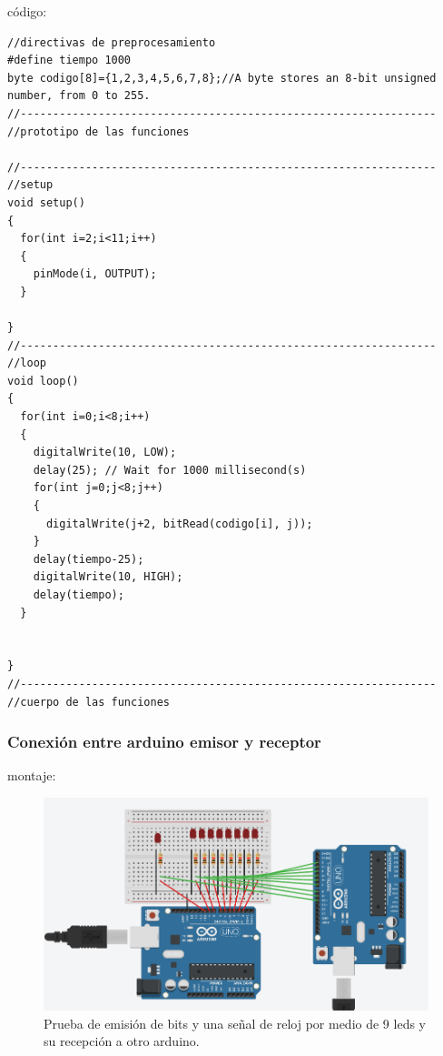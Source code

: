 \documentclass{article}
\begin{document}
código:
\begin{lstlisting}[style=myArduino]//directivas de preprocesamiento
#define tiempo 1000
byte codigo[8]={1,2,3,4,5,6,7,8};//A byte stores an 8-bit unsigned number, from 0 to 255.
//----------------------------------------------------------------
//prototipo de las funciones

//----------------------------------------------------------------
//setup
void setup()
{
  for(int i=2;i<11;i++)
  {
    pinMode(i, OUTPUT);
  }
  
}
//----------------------------------------------------------------
//loop
void loop()
{
  for(int i=0;i<8;i++)
  {
  	digitalWrite(10, LOW);
  	delay(25); // Wait for 1000 millisecond(s)
    for(int j=0;j<8;j++)
    {
      digitalWrite(j+2, bitRead(codigo[i], j));
    }
    delay(tiempo-25);
    digitalWrite(10, HIGH);
    delay(tiempo);
  }
  
  
}
//----------------------------------------------------------------
//cuerpo de las funciones
\end{lstlisting}


\newpage
\subsubsection{Conexión entre arduino emisor y receptor}\label{intento1}

montaje:
\begin{figure}[h]
\includegraphics[scale=0.6]{emisorReceptor1.png}
\centering
\caption{Prueba de emisión de bits y una señal de reloj por medio de 9 leds y su recepción a otro arduino.}
\label{fig:emisorReceptor1}
\end{figure}
\end{document}
